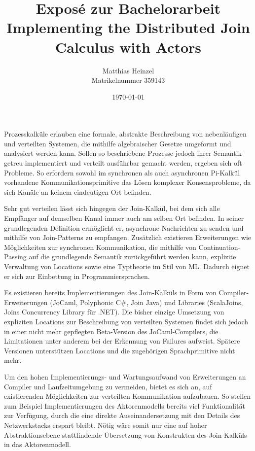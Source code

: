 \documentclass[12pt]{article}
\title{
  {\large Expos\'e zur Bachelorarbeit} \\
  Implementing the Distributed Join Calculus with Actors
}
\author{Matthias Heinzel\\Matrikelnummer 359143}
\date{\today}
\begin{document}
\maketitle

Prozesskalküle erlauben eine formale, abstrakte Beschreibung von nebenläufigen und verteilten Systemen, die mithilfe algebraischer Gesetze umgeformt und analysiert werden kann.
Sollen so beschriebene Prozesse jedoch ihrer Semantik getreu implementiert und verteilt ausführbar gemacht werden, ergeben sich oft Probleme.
So erfordern sowohl im synchronen als auch asynchronen Pi-Kalkül vorhandene Kommunikationsprimitive das Lösen komplexer Konsensprobleme, da sich Kanäle an keinem eindeutigen Ort befinden.

Sehr gut verteilen lässt sich hingegen der Join-Kalkül, bei dem sich alle Empfänger auf demselben Kanal immer auch am selben Ort befinden\cite{fournet_reflexive_1996}.
In seiner grundlegenden Definition ermöglicht er, asynchrone Nachrichten zu senden und mithilfe von Join-Patterns zu empfangen.
Zusätzlich existieren Erweiterungen wie Möglichkeiten zur synchronen Kommunikation, die mithilfe von Continuation-Passing auf die grundlegende Semantik zurückgeführt werden kann, explizite Verwaltung von Locations\cite{fournet_calculus_1996} sowie eine Typtheorie im Stil von ML\cite{fournet_implicit_1997}. Dadurch eignet er sich zur Einbettung in Programmiersprachen.

Es existieren bereits Implementierungen des Join-Kalküls in Form von Compiler-Erweiterungen (JoCaml\cite{mandel_programming_2007}, Polyphonic C\#\cite{benton_modern_2002}, Join Java\cite{itzstein_implementing_2003}) und Libraries (ScalaJoins\cite{haller_implementing_2008}, Joins Concurrency Library für .NET\cite{russo_joins_2007}).
Die bisher einzige Umsetzung von expliziten Locations zur Beschreibung von verteilten Systemen findet sich jedoch in einer nicht mehr gepflegten Beta-Version des JoCaml-Compilers, die Limitationen unter anderem bei der Erkennung von Failures aufweist\cite{conchon_jocaml:_1999}.
Spätere Versionen unterstützen Locations und die zugehörigen Sprachprimitive nicht mehr.

Um den hohen Implementierungs- und Wartungsaufwand von Erweiterungen an Compiler und Laufzeitumgebung zu vermeiden, bietet es sich an, auf existierenden Möglichkeiten zur verteilten Kommunikation aufzubauen.
So stellen zum Beispiel Implementierungen des Aktorenmodells bereits viel Funktionalität zur Verfügung, durch die eine direkte Auseinandersetzung mit den Details des Netzwerkstacks erspart bleibt.
Nötig wäre somit nur eine auf hoher Abstraktionsebene stattfindende Übersetzung von Konstrukten des Join-Kalküls in das Aktorenmodell.
\end{document}
